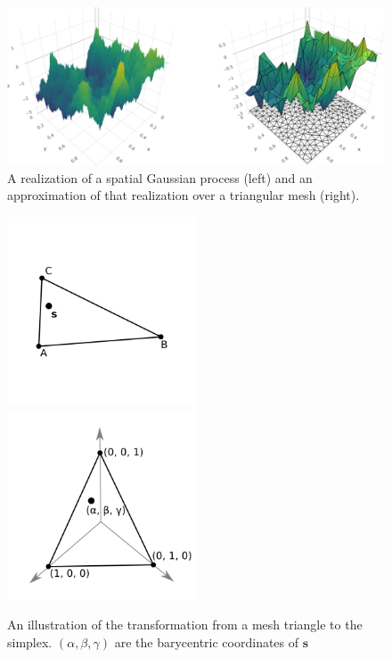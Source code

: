 \documentclass[]{interact}
\begin{document}



\begin{figure}[p]
\includegraphics[width=\textwidth]{figures/surface.png}
\caption{A realization of a spatial Gaussian process (left) and an
approximation of that realization over a triangular mesh (right).}
\label{surface}
\end{figure}

\begin{figure}[p]
\includegraphics[width=0.5\textwidth]{figures/triangle.png}
\includegraphics[width=0.5\textwidth]{figures/simplex.png}
\caption{An illustration of the transformation from a mesh triangle to the
simplex. \((\alpha, \beta, \gamma)\) are the barycentric coordinates of
\(\mathbf{s}\)}
\label{surface}
\end{figure}
\end{document}
